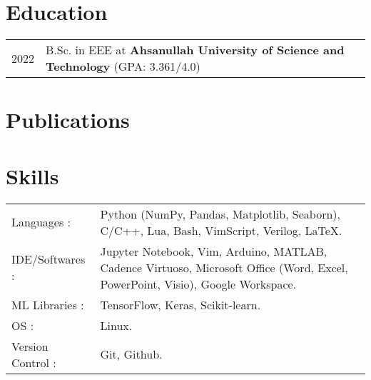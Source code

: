 \documentclass[a4paper,12pt]{article}
\begin{document}


\section{Education}
\begin{tabularx}{\linewidth}{@{}l X@{}}	
2022 & B.Sc. in EEE at \textbf{Ahsanullah University of Science and Technology} \hfill (GPA: 3.361/4.0) \\ 


\end{tabularx}



\section{Publications}
\begin{refsection}
\nocite{*}
\printbibliography[heading=none]
\end{refsection}



\section{Skills}
\begin{tabularx}{\linewidth}{@{}l X@{}}
Languages : &  \normalsize{Python (NumPy, Pandas, Matplotlib, Seaborn), C/C++, Lua, Bash, VimScript, Verilog, \LaTeX.}\\
IDE/Softwares : &  \normalsize{Jupyter Notebook, Vim, Arduino, MATLAB, Cadence Virtuoso, Microsoft Office (Word, Excel, PowerPoint, Visio), Google Workspace.}\\  
ML Libraries :   &  \normalsize{TensorFlow, Keras, Scikit-learn.}\\ 
OS :  &  \normalsize{Linux.}\\ 
Version Control : &  \normalsize{Git, Github.}\\
\end{tabularx}

\vfill
{}
\end{document}
